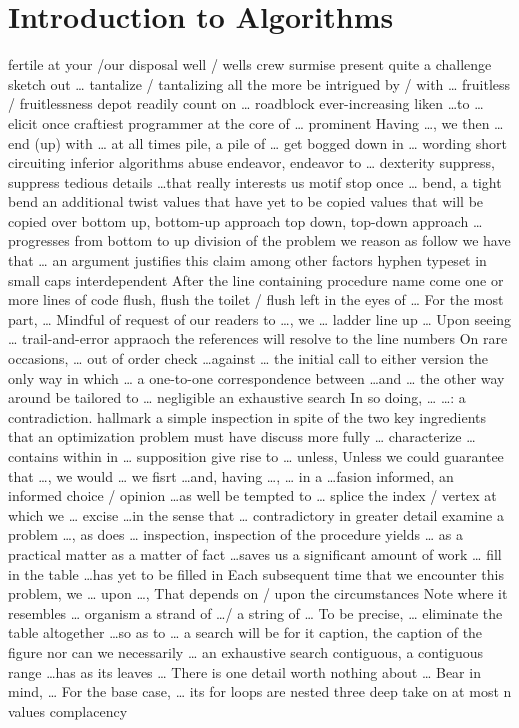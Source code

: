 \documentclass[12pt]{article}
\begin{document}
\section{Introduction to Algorithms}
fertile 
at your /our disposal 
well / wells 
crew 
surmise 
present quite a challenge 
sketch out \dots 
tantalize / tantalizing 
all the more 
be intrigued by / with \dots 
fruitless / fruitlessness 
depot 
readily 
count on \dots 
roadblock 
ever-increasing 
liken \dots to \dots 
elicit 
once 
craftiest programmer 
at the core of \dots 
prominent 
Having \dots, we then \dots 
end (up) with \dots 
at all times 
pile, a pile of \dots 
get bogged down in \dots 
wording 
short circuiting 
inferior algorithms 
abuse 
endeavor, endeavor to \dots 
dexterity 
suppress, suppress tedious details 
\dots that really interests us 
motif 
stop once \dots 
bend, a tight bend 
an additional twist 
values that have yet to be copied 
values that will be copied over 
bottom up, bottom-up approach
top down, top-down approach 
\dots progresses from bottom to up 
division of the problem 
we reason as follow 
we have that \dots 
an argument justifies this claim 
among other factors
hyphen
typeset 
in small caps 
interdependent 
After the line containing procedure name come one or more lines of code 
flush, flush the toilet / flush left 
in the eyes of \dots 
For the most part, \dots 
Mindful of request of our readers to \dots, we \dots 
ladder 
line up \dots 
Upon seeing \dots 
trail-and-error appraoch 
the references will resolve to the line numbers 
On rare occasions, \dots 
out of order 
check \dots against \dots 
the initial call to either version 
the only way in which \dots 
a one-to-one correspondence between \dots and \dots 
the other way around 
be tailored to \dots 
negligible
an exhaustive search
In so doing, \dots 
\dots: a contradiction. 
hallmark 
a simple inspection 
in spite of 
the two key ingredients that an optimization problem must have 
discuss more fully \dots 
characterize
\dots contains within in \dots 
supposition 
give rise to \dots 
unless, Unless we could guarantee that \dots, we would \dots 
we fisrt \dots and, having \dots, \dots 
in a \dots fasion 
informed, an informed choice / opinion 
\dots as well 
be tempted to \dots 
splice 
the index / vertex at which we \dots 
excise 
\dots in the sense that \dots 
contradictory 
in greater detail 
examine a problem 
\dots, as does \dots 
inspection, inspection of the procedure yields \dots 
as a practical matter 
as a matter of fact 
\dots saves us a significant amount of work \dots 
fill in the table 
\dots has yet to be filled in 
Each subsequent time that we encounter this problem, we \dots 
upon \dots, That depends on / upon the circumstances 
Note where it resembles \dots 
organism 
a strand of \dots / a string of \dots 
To be precise, \dots 
eliminate the table altogether 
\dots so as to \dots 
a search will be for it 
caption, the caption of the figure 
nor can we necessarily \dots 
an exhaustive search 
contiguous, a contiguous range
\dots has as its leaves \dots 
There is one detail worth nothing about \dots 
Bear in mind, \dots 
For the base case, \dots 
its for loops are nested three deep 
take on at most n values 
complacency 
\end{document}
